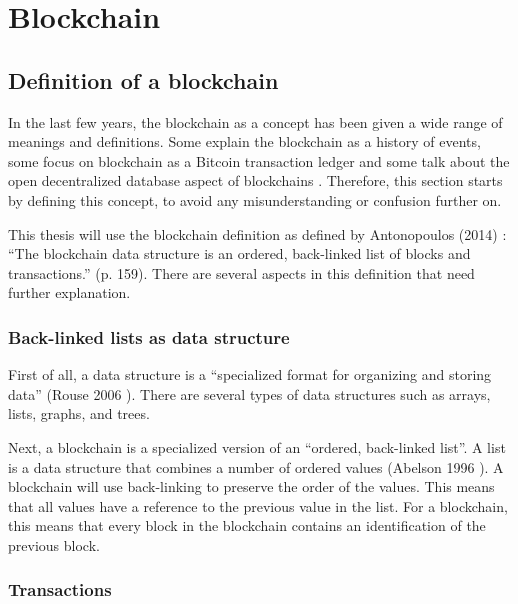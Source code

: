 \section{Blockchain}

\subsection{Definition of a blockchain}

\iffalse
todo: 
- different interpretations of blockchain
- reread and remove weird references
\fi

In the last few years, the blockchain as a concept has been given a wide range of meanings and definitions. Some explain the blockchain as a history of events, some focus on blockchain as a Bitcoin transaction ledger and some talk about the open decentralized database aspect of blockchains \cite{blockchain-multiple-definitions}. Therefore, this section starts by defining this concept, to avoid any misunderstanding or confusion further on.

This thesis will use the blockchain definition as defined by Antonopoulos (2014) \cite{antonopoulos:2014}: ``The blockchain data structure is an ordered, back-linked list of blocks and transactions.'' (p. 159). There are several aspects in this definition that need further explanation.

\subsubsection{Back-linked lists as data structure}

First of all, a data structure is a ``specialized format for organizing and storing data'' (Rouse 2006 \cite{data-structure}). There are several types of data structures such as arrays, lists, graphs, and trees.

Next, a blockchain is a specialized version of an ``ordered, back-linked list''. A list is a data structure that combines a number of ordered values (Abelson 1996 \cite{abelson:1996}). A blockchain will use back-linking to preserve the order of the values. This means that all values have a reference to the previous value in the list. For a blockchain, this means that every block in the blockchain contains an identification of the previous block.

\subsubsection{Transactions}

